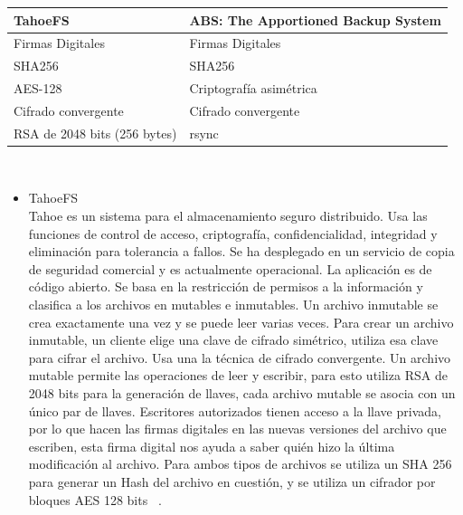 \begin{tabular}{ |p{8cm}|p{8cm}| }
\hline
{ \textbf{TahoeFS}} & {\textbf{ABS: The Apportioned Backup System} } \\
\hline
{Firmas Digitales} & {Firmas Digitales} \\
\hline
{SHA256} & {SHA256} \\
\hline
{AES-128} & {Criptografía asimétrica} \\
\hline
{Cifrado convergente} & {Cifrado convergente} \\
\hline
{RSA de 2048 bits (256 bytes) } & { rsync } \\
\hline
\end{tabular}
\\
\begin{itemize}
\item TahoeFS\\

Tahoe es un sistema para el almacenamiento seguro distribuido. Usa las funciones de control de acceso, criptografía, confidencialidad, integridad y eliminación para tolerancia a fallos. Se ha desplegado en un servicio de copia de seguridad comercial y es actualmente operacional. La aplicación es de código abierto. Se basa en la restricción de permisos a la información y clasifica a los archivos en mutables e inmutables. Un archivo inmutable se crea exactamente una vez y se puede leer varias veces. Para crear un archivo inmutable, un cliente elige una clave de cifrado simétrico, utiliza esa clave para cifrar el archivo. Usa una la técnica de cifrado convergente.
Un archivo mutable permite las operaciones de leer y escribir, para esto utiliza RSA de 2048 bits para la generación de llaves, cada archivo mutable se asocia con un único par de llaves. Escritores autorizados tienen acceso a la llave privada, por lo que hacen las firmas digitales en las nuevas versiones del archivo que escriben, esta firma digital nos ayuda a saber quién hizo la última modificación al archivo.
Para ambos tipos de archivos se utiliza un SHA 256 para generar un Hash del archivo en cuestión, y se utiliza un cifrador por bloques AES 128 bits ~\cite{tahoe}. \\



\end{itemize}
